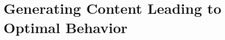 \chapter{Generating Content Leading to Optimal Behavior}
\label{chatper:Generating Content Leading to Optimal Behavior}


